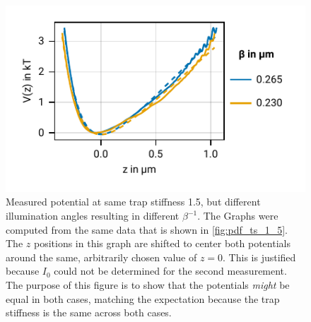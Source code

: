 \documentclass[
    twoside=false,
    twocolumn=true,
    fontsize=11pt,
]{scrarticle}
\begin{document}
\begin{figure}
    \centering
    \includegraphics{figures/02_06_01_different_beta.pdf}
    \caption{Measured potential at same trap stiffness \SI{1.5}{}, but different illumination angles resulting in different $\beta^{-1}$. The Graphs were computed from the same data that is shown in \autoref{fig:pdf_ts_1_5}. The $z$ positions in this graph are shifted to center both potentials around the same, arbitrarily chosen value of $z=0$. This is justified because $I_0$ could not be determined for the second measurement. The purpose of this figure is to show that the potentials \textit{might} be equal in both cases, matching the expectation because the trap stiffness is the same across both cases.}
    \label{fig:pot_ts_1_5}
\end{figure}
\end{document}
